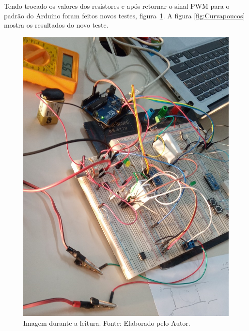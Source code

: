 Tendo trocado os valores dos resistores e após retornar o sinal PWM para o padrão do Arduino foram feitos novos testes, figura~\ref{fig:Leitura}. A figura \ref{fig:Curvapoucos} mostra os resultados do novo teste.
\FloatBarrier
\begin{figure}[!htbp]
	\centering
	\includegraphics[scale=0.2]{imagens/Leitura.png}
	\caption{Imagem durante a leitura. Fonte: Elaborado pelo Autor. 	}
	\label{fig:Leitura}
\end{figure}
\FloatBarrier

